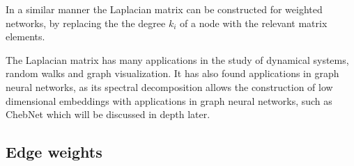 In a similar manner the Laplacian matrix can be constructed for weighted networks,
by replacing the the degree $k_i$ of a node with the relevant matrix elements.

The Laplacian matrix has many applications in the study of dynamical systems,
random walks and graph visualization. It has also found applications in graph
neural networks, as its spectral decomposition allows the construction of low
dimensional embeddings with applications in graph neural networks, such as
ChebNet \cite{article:ChebNet} which will be discussed in depth later.

\subsection{Edge weights} \label{sec:edge_weights}

